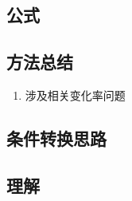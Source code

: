 \documentclass[a4paper,12pt]{article}
\begin{document}
    \subsection{公式}

    \begin{enumerate}

    \end{enumerate}

    \subsection{方法总结}

    \begin{enumerate}
        \item 涉及相关变化率问题

    \end{enumerate}

    \subsection{条件转换思路}

    \begin{enumerate}

    \end{enumerate}

    \subsection{理解}

    \begin{enumerate}
    \end{enumerate}
\end{document}
